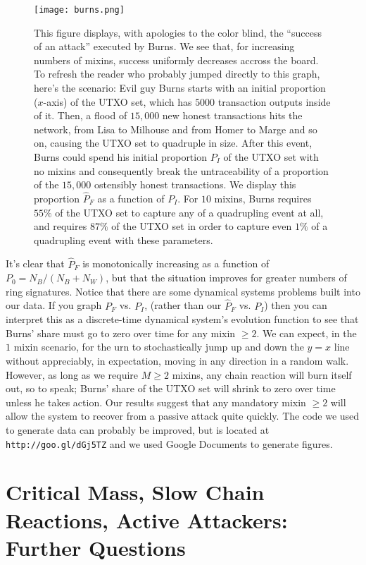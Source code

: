 \documentclass{mrl}
\begin{document}
\begin{figure}[!h]
\centering
\texttt{[image: burns.png]}
\caption{This figure displays, with apologies to the color blind, the ``success of an attack'' executed by Burns. We see that, for increasing numbers of mixins, success uniformly decreases accross the board. To refresh the reader who probably jumped directly to this graph,  here's the scenario: Evil guy Burns starts with an initial proportion ($x$-axis) of the UTXO set, which has $5000$ transaction outputs inside of it. Then, a flood of $15,000$ new honest transactions hits the network, from Lisa to Milhouse and from Homer to Marge and so on, causing the UTXO set to quadruple in size. After this event, Burns could spend his initial proportion $P_I$ of the UTXO set with no mixins and consequently break the untraceability of a proportion of the $15,000$ ostensibly honest transactions. We display this proportion $\widehat{P}_F$ as a function of $P_I$. For $10$ mixins, Burns requires $55\%$ of the UTXO set to capture any of a quadrupling event at all, and requires $87\%$ of the UTXO set in order to capture even $1\%$ of a quadrupling event with these parameters.}
\label{fig1}
\end{figure}

It's clear that $\widehat{P}_F$ is monotonically increasing as a function of $P_0 = N_B/(N_B + N_W)$, but that the situation improves for greater numbers of ring signatures. Notice that there are some dynamical systems problems built into our data. If you graph $P_F$ vs. $P_I$, (rather than our $\widehat{P}_F$ vs. $P_I$) then you can interpret this as a discrete-time dynamical system's evolution function to see that Burns' share must go to zero over time for any mixin $\geq 2$. We can expect, in the $1$ mixin scenario, for the urn to stochastically jump up and down the $y=x$ line without appreciably, in expectation, moving in any direction in a random walk. However, as long as we require $M \geq 2$ mixins, any chain reaction will burn itself out, so to speak; Burns' share of the UTXO set will shrink to zero over time unless he takes action. Our results suggest that any mandatory mixin $\geq 2$ will allow the system to recover from a passive attack quite quickly. The code we used to generate data can probably be improved, but is located at \texttt{http://goo.gl/dGj5TZ} and we used Google Documents to generate figures.

\section{Critical Mass, Slow Chain Reactions, Active Attackers: Further Questions}
\end{document}
